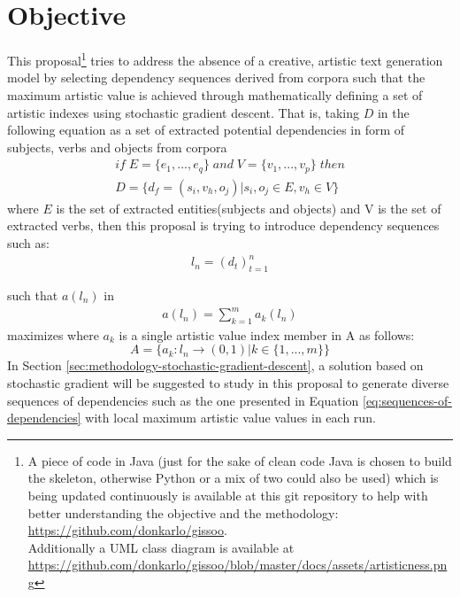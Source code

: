 \documentclass{article}
\begin{document}
	\section{Objective} \label{sec:objective}
	This proposal\footnote{A piece of code in Java (just for the sake of clean code Java is chosen to build the skeleton, otherwise Python or a mix of two could also be used) which is being updated continuously is available at this  git repository to help with better understanding the objective and the methodology: \\ \url{https://github.com/donkarlo/gissoo}. \\Additionally a UML class diagram is available at\\ \url{https://github.com/donkarlo/gissoo/blob/master/docs/assets/artisticness.png}} tries to address the absence of a creative, artistic text generation model by selecting dependency sequences derived from corpora such that the maximum artistic value is achieved through mathematically defining a set of artistic indexes using stochastic gradient descent.   
	That is, taking $D$ in the following equation as a set of extracted potential dependencies in form of subjects, verbs and objects from corpora
	\begin{equation}
	\begin{split}
	if \; E=\{e_1,...,e_q\} \;and\; V=\{v_1,...,v_p\} \; then
	\\
	D = \{d_f = (s_i,v_h,o_j)|s_i,o_j \in E , v_h \in V \}
	\end{split}
	\label{eq:space-of-possible-dependencies}
	\end{equation} 
	where $E$ is the set of extracted entities(subjects and objects) and V is the set of extracted verbs,
	then this proposal is trying to introduce dependency sequences such as: 
	\begin{equation}
	\begin{split}
	l_n = (d_t)_{t=1}^{n}
	\end{split}
	\label{eq:sequences-of-dependencies}
	\end{equation} 
	
	such that $a(l_n)$ in 
	\begin{equation}
		\begin{split}
			a(l_n) =  \sum_{k=1}^{m}a_k(l_n) 
		\end{split}
		\label{eq:comprehensive-artistic-function}
	\end{equation}
	maximizes where $a_k$ is a single artistic value index member in A as follows:
	\begin{equation}
	A=\{a_k:l_n\longrightarrow(0,1)|k\in\{1,...,m\}\}
	\label{eq:artistic-indexes}
	\end{equation}
	In Section \ref{sec:methodology-stochastic-gradient-descent}, a solution based on stochastic gradient will be suggested to study in this proposal to generate diverse sequences of dependencies such as the one presented in Equation \ref{eq:sequences-of-dependencies} with local maximum artistic value values in each run.
\end{document}
